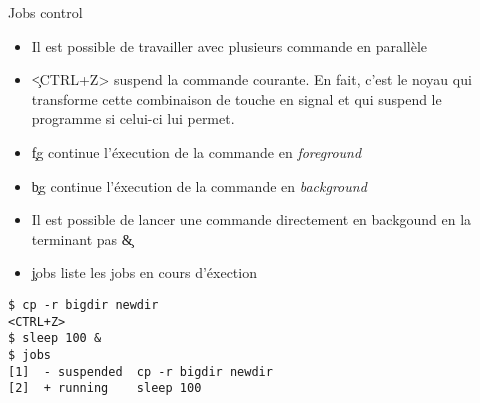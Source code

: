 \begin{frame}[fragile=singleslide]{Jobs control}
  \begin{itemize}
  \item Il est possible de travailler avec plusieurs commande en parallèle
  \item \c{<CTRL+Z>} suspend la commande courante. En fait, c'est le
    noyau qui transforme cette combinaison de touche en signal et qui
    suspend le programme si celui-ci lui permet.
  \item \c{fg} continue l'éxecution de la commande en \emph{foreground}
  \item \c{bg} continue l'éxecution de la commande en \emph{background}
  \item Il est possible de lancer une commande directement en
    backgound en la terminant pas \c{&}
  \item \c{jobs} liste les jobs en cours d'éxection
  \end{itemize}
  \begin{lstlisting}
$ cp -r bigdir newdir
<CTRL+Z>
$ sleep 100 &
$ jobs
[1]  - suspended  cp -r bigdir newdir
[2]  + running    sleep 100
  \end{lstlisting}
\end{frame}

